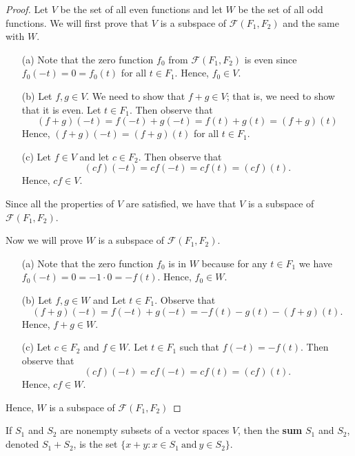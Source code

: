 \begin{proof}
    Let \( V  \) be the set of all even functions and let \( W  \) be the set of all odd functions. We will first prove that \( V  \) is a subspace of \( \mathcal{F}(F_{1}, F_{2})  \) and the same with \( W  \).
    \begin{enumerate}
        \item[(a)] Note that the zero function \( f_{0}  \) from \( \mathcal{F}(F_{1}, F_{2})  \) is even since \( f_{0}(-t) = 0 = f_{0}(t)  \) for all \( t \in F_{1}   \). Hence, \( f_{0} \in V  \).
        \item[(b)] Let \( f,g \in V  \). We need to show that \( f+ g \in V   \); that is, we need to show that it is even. Let \( t \in F_{1}  \). Then observe that 
            \[  (f+g)(-t) = f(-t) + g(-t) = f(t) + g(t) = (f+g)(t)   \]
            Hence, \( (f+g)(-t) = (f+g)(t) \) for all \( t \in F_{1}  \).
        \item[(c)]  Let \( f \in V  \) and let \( c \in F_{2} \). Then observe that 
            \[  (cf)(-t) = c f(-t) = c f(t) = (cf)(t).  \]
            Hence, \( cf \in V  \).
    \end{enumerate}
    Since all the properties of \( V  \) are satisfied, we have that \( V  \) is a subspace of \( \mathcal{F}(F_{1}, F_{2})  \).
   
    Now we will prove \( W  \) is a subspace of \( \mathcal{F}(F_{1}, F_{2})  \).
    \begin{enumerate}
        \item[(a)] Note that the zero function \( f_{0}  \) is in \( W  \) because for any \( t \in F_{1}  \) we have \( f_{0}(-t) = 0 = -1 \cdot 0 = -f(t). \) Hence, \( f_{0} \in W  \).
        \item[(b)] Let \( f,g \in W  \) and Let \( t \in F_{1}  \). Observe that  
            \[  (f+g)(-t) = f(-t) + g(-t) = -f(t) - g(t) -(f+g)(t).  \]
            Hence, \( f+g \in W  \).
        \item[(c)] Let \( c \in F_{2}  \) and \( f \in W  \). Let \( t \in F_{1}  \) such that \( f(-t) = - f(t)  \). Then observe that 
            \[  (cf)(-t) = c f(-t) = c f(t) = (cf)(t).  \]
            Hence, \( cf \in W  \).
    \end{enumerate}
    Hence, \( W  \) is a subspace of \( \mathcal{F}(F_{1}, F_{2}) \)
\end{proof}


\begin{definition}
    If \( S_{1}  \) and \( S_{2}   \) are nonempty subsets of a vector spaces \( V  \), then the \textbf{sum} \( S_{1}  \) and \( S_{2}  \), denoted \( S_{1} + S_{2} \), is the set \( \{ x + y : x \in S_{1} \ \text{and} \  y \in S_{2}  \}  \).
\end{definition}


